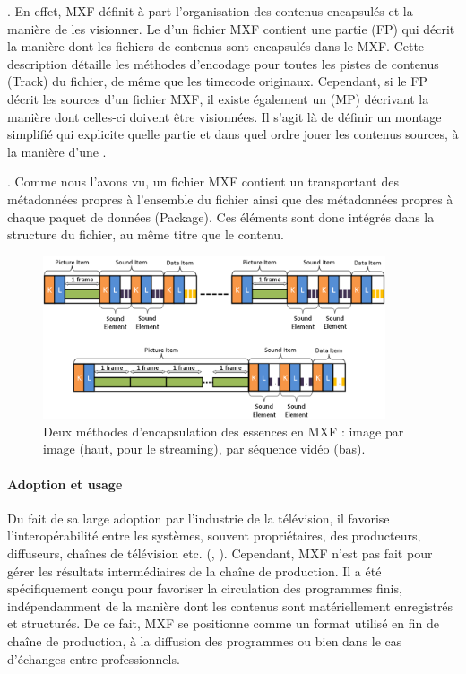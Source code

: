 \begin{liste}
	\item {}. 
	En effet, MXF définit à part l'organisation des contenus encapsulés et la manière de les visionner.
	Le 	d'un fichier MXF contient une partie  (FP) qui décrit la manière dont les fichiers de contenus sont encapsulés dans le MXF. 
	Cette description détaille les méthodes d'encodage pour toutes les pistes de contenus (Track) du fichier, de même que les timecode originaux.
	Cependant, si le FP décrit les sources d'un fichier MXF, il existe également un  (MP) décrivant la manière dont celles-ci doivent être visionnées.
	Il s'agit là de définir un montage simplifié qui explicite quelle partie et dans quel ordre jouer les contenus sources, à la manière d'une . 

	\item {}. 
	Comme nous l'avons vu, un fichier MXF contient un  transportant des métadonnées propres à l'ensemble du fichier ainsi que des métadonnées propres à chaque paquet de données (Package). 
	Ces éléments sont donc intégrés dans la structure du fichier, au même titre que le contenu.
\end{liste}


\begin{figure}[ht!]
\centering
\includegraphics[width=0.9\textwidth]{images/MXF-ContentPackage.png}
\caption{Deux méthodes d'encapsulation des essences en MXF : image par image (haut, pour le streaming), par séquence vidéo (bas).}
\label{img:mxf-content}
\end{figure}

\paragraph{Adoption et usage}
Du fait de sa large adoption par l'industrie de la télévision, il favorise l'interopérabilité entre les systèmes, souvent propriétaires, des producteurs, diffuseurs, chaînes de télévision etc. (\cite{Ferreira2010}, \cite{Devlin2002}). 
Cependant, MXF n'est pas fait pour gérer les résultats intermédiaires de la chaîne de production. 
Il a été spécifiquement conçu pour favoriser la circulation des programmes finis, indépendamment de la manière dont les contenus sont matériellement enregistrés et structurés.
De ce fait, MXF se positionne comme un format utilisé en fin de chaîne de production, à la diffusion des programmes ou bien dans le cas d'échanges entre professionnels.

